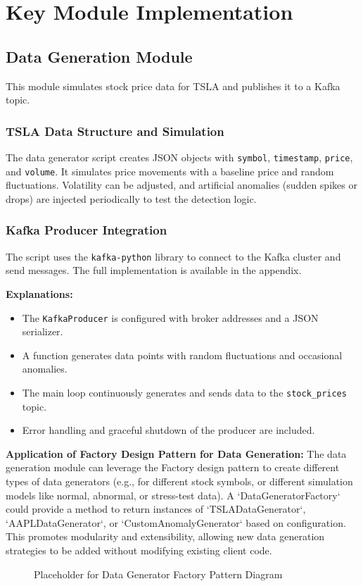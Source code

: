 \section{Key Module Implementation}

\subsection{Data Generation Module}

This module simulates stock price data for TSLA and publishes it to a Kafka topic.

\subsubsection{TSLA Data Structure and Simulation}
The data generator script creates JSON objects with \texttt{symbol}, \texttt{timestamp}, \texttt{price}, and \texttt{volume}.
It simulates price movements with a baseline price and random fluctuations. Volatility can be adjusted, and artificial anomalies (sudden spikes or drops) are injected periodically to test the detection logic.

\subsubsection{Kafka Producer Integration}
The script uses the \texttt{kafka-python} library to connect to the Kafka cluster and send messages. The full implementation is available in the appendix.

\textbf{Explanations:}
\begin{itemize}
    \item The \texttt{KafkaProducer} is configured with broker addresses and a JSON serializer.
    \item A function generates data points with random fluctuations and occasional anomalies.
    \item The main loop continuously generates and sends data to the \texttt{stock\_prices} topic.
    \item Error handling and graceful shutdown of the producer are included.
\end{itemize}

\textbf{Application of Factory Design Pattern for Data Generation:}
The data generation module can leverage the Factory design pattern to create different types of data generators (e.g., for different stock symbols, or different simulation models like normal, abnormal, or stress-test data). A `DataGeneratorFactory` could provide a method to return instances of `TSLADataGenerator`, `AAPLDataGenerator`, or `CustomAnomalyGenerator` based on configuration. This promotes modularity and extensibility, allowing new data generation strategies to be added without modifying existing client code.
\begin{figure}[h!]
    \centering
    \caption{Placeholder for Data Generator Factory Pattern Diagram}
    \label{fig:data_generator_factory_diagram}
\end{figure}

